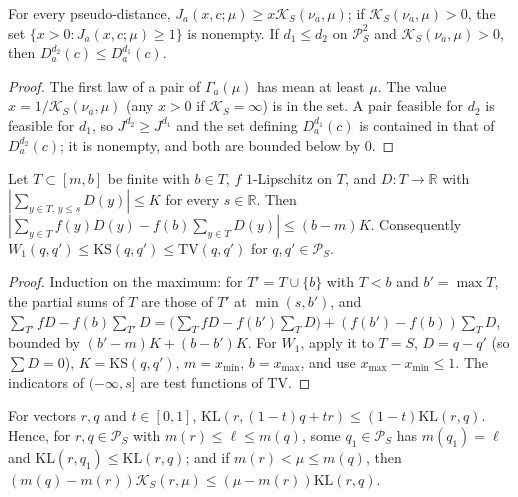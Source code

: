 \documentclass[11pt]{article}
\newcommand{\xmax}{x_{\max}}
\newcommand{\Simp}{\mathcal{P}_{S}}
\newcommand{\mean}{m}
\newcommand{\KL}{\mathrm{KL}}
\newcommand{\TV}{\mathrm{TV}}
\newcommand{\Ks}{\mathcal{K}_{S}}
\newcommand{\Wone}{W_{1}}
\begin{document}
\begin{lemma}\label{flem:order-mono}
For every pseudo-distance, $J_a(x,c;\mu)\ge x\Ks(\nu_a,\mu)$; if $\Ks(\nu_a,\mu)>0$, the set
$\{x>0:J_a(x,c;\mu)\ge1\}$ is nonempty. If $d_1\le d_2$ on $\Simp^2$ and $\Ks(\nu_a,\mu)>0$, then
$D^{d_2}_a(c)\le D^{d_1}_a(c)$.
\end{lemma}

\begin{proof}
The first law of a pair of $\Gamma_a(\mu)$ has mean at least $\mu$. The value $x=1/\Ks(\nu_a,\mu)$
(any $x>0$ if $\Ks=\infty$) is in the set. A pair feasible for $d_2$ is feasible for $d_1$, so
$J^{d_2}\ge J^{d_1}$ and the set defining $D^{d_1}_a(c)$ is contained in that of $D^{d_2}_a(c)$; it
is nonempty, and both are bounded below by $0$.
\end{proof}

\begin{lemma}\label{flem:abel}
Let $T\subset[m,b]$ be finite with $b\in T$, $f$ $1$-Lipschitz on $T$, and $D:T\to\mathbb R$ with
$|\sum_{y\in T,\,y\le s}D(y)|\le K$ for every $s\in\mathbb R$. Then
$|\sum_{y\in T}f(y)D(y)-f(b)\sum_{y\in T}D(y)|\le(b-m)K$. Consequently
$\Wone(q,q')\le\mathrm{KS}(q,q')\le\TV(q,q')$ for $q,q'\in\Simp$.
\end{lemma}

\begin{proof}
Induction on the maximum: for $T'=T\cup\{b\}$ with $T<b$ and $b'=\max T$, the partial sums of $T$
are those of $T'$ at $\min(s,b')$, and
$\sum_{T'}fD-f(b)\sum_{T'}D=\big(\sum_TfD-f(b')\sum_TD\big)+(f(b')-f(b))\sum_TD$, bounded by
$(b'-m)K+(b-b')K$. For $\Wone$, apply it to $T=S$, $D=q-q'$ (so $\sum D=0$), $K=\mathrm{KS}(q,q')$,
$m=x_{\min}$, $b=\xmax$, and use $\xmax-x_{\min}\le1$. The indicators of $(-\infty,s]$ are test
functions of $\TV$.
\end{proof}

\begin{lemma}\label{flem:mix}
For vectors $r,q$ and $t\in[0,1]$, $\KL(r,(1-t)q+tr)\le(1-t)\KL(r,q)$. Hence, for $r,q\in\Simp$ with
$\mean(r)\le\ell\le\mean(q)$, some $q_1\in\Simp$ has $\mean(q_1)=\ell$ and $\KL(r,q_1)\le\KL(r,q)$; and if
$\mean(r)<\mu\le\mean(q)$, then $(\mean(q)-\mean(r))\Ks(r,\mu)\le(\mu-\mean(r))\KL(r,q)$.
\end{lemma}
\end{document}
